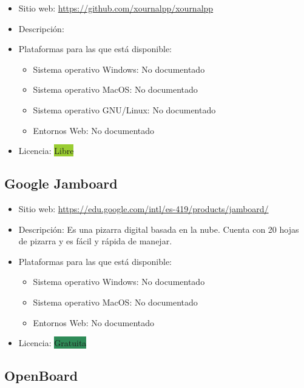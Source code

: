 \documentclass[11pt]{article}
\newcommand{\nodoc}{No documentado}
\newcommand{\libre}{\colorbox{YellowGreen}{Libre}}
\newcommand{\gratis}{\colorbox{SeaGreen}{Gratuita}}
\begin{document}
\begin{itemize}
\item Sitio web: \url{https://github.com/xournalpp/xournalpp}
\item Descripción:
\item Plataformas para las que está disponible:
  \begin{itemize}
  \item Sistema operativo Windows: \nodoc
  \item Sistema operativo MacOS: \nodoc
  \item Sistema operativo GNU/Linux: \nodoc
  \item Entornos Web: \nodoc
  \end{itemize}
\item Licencia: \libre
\end{itemize}


\subsection{Google Jamboard}

\begin{itemize}
\item Sitio web: \url{https://edu.google.com/intl/es-419/products/jamboard/}
\item Descripción: Es una pizarra digital basada en la nube. Cuenta con 20 hojas de pizarra y es fácil y rápida de manejar.
\item Plataformas para las que está disponible:
  \begin{itemize}
  \item Sistema operativo Windows: \nodoc
  \item Sistema operativo MacOS: \nodoc
  \item Entornos Web: \nodoc
  \end{itemize}
\item Licencia: \gratis
\end{itemize}

\subsection{OpenBoard}
\end{document}
